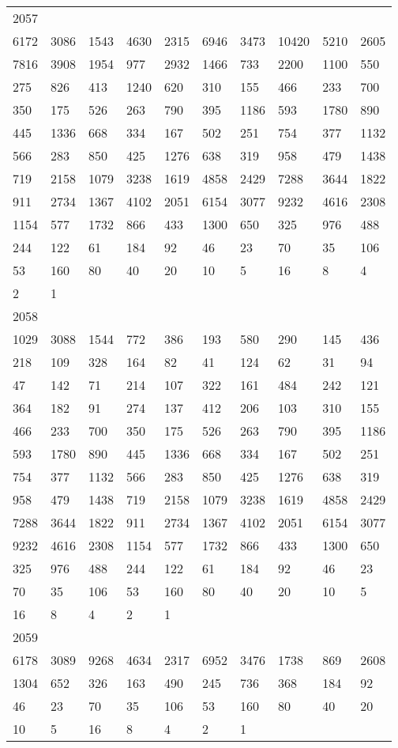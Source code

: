\begin{longtable}{*{10}{l}}
2057&&&&&&&&&\\
6172& 3086& 1543& 4630& 2315& 6946& 3473& 10420& 5210& 2605\\
7816& 3908& 1954& 977& 2932& 1466& 733& 2200& 1100& 550\\
275& 826& 413& 1240& 620& 310& 155& 466& 233& 700\\
350& 175& 526& 263& 790& 395& 1186& 593& 1780& 890\\
445& 1336& 668& 334& 167& 502& 251& 754& 377& 1132\\
566& 283& 850& 425& 1276& 638& 319& 958& 479& 1438\\
719& 2158& 1079& 3238& 1619& 4858& 2429& 7288& 3644& 1822\\
911& 2734& 1367& 4102& 2051& 6154& 3077& 9232& 4616& 2308\\
1154& 577& 1732& 866& 433& 1300& 650& 325& 976& 488\\
244& 122& 61& 184& 92& 46& 23& 70& 35& 106\\
53& 160& 80& 40& 20& 10& 5& 16& 8& 4\\
2& 1& \\

2058&&&&&&&&&\\
1029& 3088& 1544& 772& 386& 193& 580& 290& 145& 436\\
218& 109& 328& 164& 82& 41& 124& 62& 31& 94\\
47& 142& 71& 214& 107& 322& 161& 484& 242& 121\\
364& 182& 91& 274& 137& 412& 206& 103& 310& 155\\
466& 233& 700& 350& 175& 526& 263& 790& 395& 1186\\
593& 1780& 890& 445& 1336& 668& 334& 167& 502& 251\\
754& 377& 1132& 566& 283& 850& 425& 1276& 638& 319\\
958& 479& 1438& 719& 2158& 1079& 3238& 1619& 4858& 2429\\
7288& 3644& 1822& 911& 2734& 1367& 4102& 2051& 6154& 3077\\
9232& 4616& 2308& 1154& 577& 1732& 866& 433& 1300& 650\\
325& 976& 488& 244& 122& 61& 184& 92& 46& 23\\
70& 35& 106& 53& 160& 80& 40& 20& 10& 5\\
16& 8& 4& 2& 1& \\

2059&&&&&&&&&\\
6178& 3089& 9268& 4634& 2317& 6952& 3476& 1738& 869& 2608\\
1304& 652& 326& 163& 490& 245& 736& 368& 184& 92\\
46& 23& 70& 35& 106& 53& 160& 80& 40& 20\\
10& 5& 16& 8& 4& 2& 1& \\


\end{longtable}

